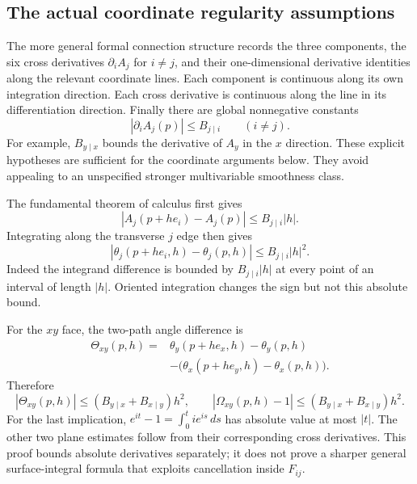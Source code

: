 \subsection{The actual coordinate regularity assumptions}
The more general formal connection structure records the three components, the six cross derivatives $\partial_iA_j$ for $i\ne j$, and their one-dimensional derivative identities along the relevant coordinate lines. Each component is continuous along its own integration direction. Each cross derivative is continuous along the line in its differentiation direction. Finally there are global nonnegative constants
\[
 |\partial_iA_j(p)|\leq B_{j\mid i}\qquad(i\ne j).
\]
For example, $B_{y\mid x}$ bounds the derivative of $A_y$ in the $x$ direction. These explicit hypotheses are sufficient for the coordinate arguments below. They avoid appealing to an unspecified stronger multivariable smoothness class.

The fundamental theorem of calculus first gives
\[
 |A_j(p+h e_i)-A_j(p)|\leq B_{j\mid i}|h|.
\]
Integrating along the transverse $j$ edge then gives
\begin{equation}
 |\theta_j(p+h e_i,h)-\theta_j(p,h)|
 \leq B_{j\mid i}|h|^2.
 \label{g:angle-variation}
\end{equation}
Indeed the integrand difference is bounded by $B_{j\mid i}|h|$ at every point of an interval of length $|h|$. Oriented integration changes the sign but not this absolute bound.

For the $xy$ face, the two-path angle difference is
\begin{align*}
 \Theta_{xy}(p,h)
 ={}&\theta_y(p+h e_x,h)-\theta_y(p,h)\\
    &-\bigl(\theta_x(p+h e_y,h)-\theta_x(p,h)\bigr).
\end{align*}
Therefore
\[
 |\Theta_{xy}(p,h)|\leq
   (B_{y\mid x}+B_{x\mid y})h^2,
 \qquad
 |\Omega_{xy}(p,h)-1|\leq
   (B_{y\mid x}+B_{x\mid y})h^2.
\]
For the last implication, $e^{it}-1=\int_0^t i e^{is}\,ds$ has absolute value at most $|t|$. The other two plane estimates follow from their corresponding cross derivatives. This proof bounds absolute derivatives separately; it does not prove a sharper general surface-integral formula that exploits cancellation inside $F_{ij}$.

